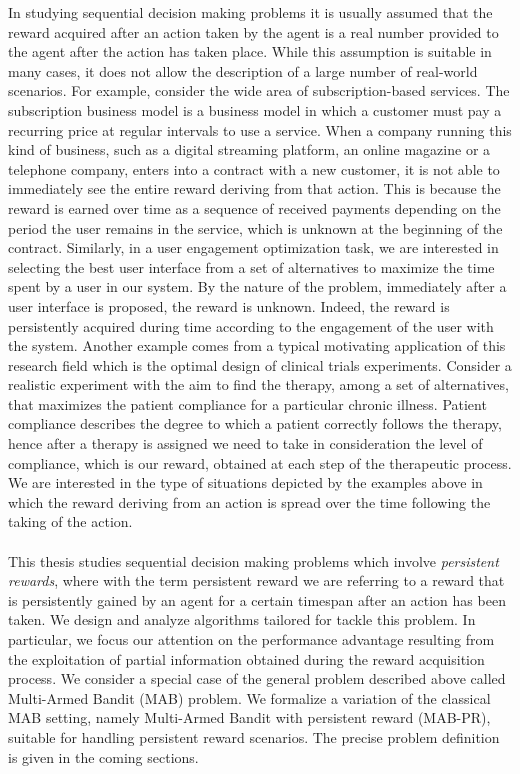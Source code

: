 In studying sequential decision making problems it is usually assumed that the reward acquired after an action taken by the agent is a real number provided to the agent after the action has taken place. While this assumption is suitable in many cases, it does not allow the description of a large number of real-world scenarios. For example, consider the wide area of subscription-based services. The subscription business model is a business model in which a customer must pay a recurring price at regular intervals to use a service. When a company running this kind of business, such as a  digital streaming platform, an online magazine or a telephone company, enters into a contract with a new customer, it is not able to immediately see the entire reward deriving from that action. This is because the reward is earned over time as a sequence of received payments depending on the period the user remains in the service, which is unknown at the beginning of the contract. Similarly, in a user engagement optimization task, we are interested in selecting the best user interface from a set of alternatives to maximize the time spent by a user in our system. By the nature of the problem, immediately after a user interface is proposed, the reward is unknown. Indeed, the reward is persistently acquired during time according to the engagement of the user with the system. Another example comes from a typical motivating application of this research field which is the optimal design of clinical trials experiments. Consider a realistic experiment with the aim to find the therapy, among a set of alternatives, that maximizes the patient compliance for a particular chronic illness. Patient compliance describes the degree to which a patient correctly follows the therapy, hence after a therapy is assigned we need to take in consideration the level of compliance, which is our reward, obtained at each step of the therapeutic process. We are interested in the type of situations depicted by the examples above in which the reward deriving from an action is spread over the time following the taking of the action.
\\\\
This thesis studies sequential decision making problems which involve \emph{persistent rewards}, where with the term persistent reward we are referring to a reward that is persistently gained by an agent for a certain timespan after an action has been taken. We design and analyze algorithms tailored for tackle this problem. In particular, we focus our attention on the performance advantage resulting from the exploitation of partial information obtained during the reward acquisition process.
We consider a special case of the general problem described above called Multi-Armed Bandit (MAB) problem. We formalize a variation of the classical MAB setting, namely Multi-Armed Bandit with persistent reward (MAB-PR), suitable for handling persistent reward scenarios. The precise problem definition is given in the coming sections.
\\\\









